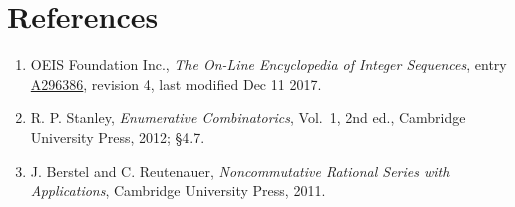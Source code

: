 \documentclass[11pt]{article}
\theoremstyle{definition}
\begin{document}
\section{References}

\begin{enumerate}

\item OEIS Foundation Inc., \emph{The On-Line Encyclopedia of Integer Sequences}, entry \href{https://oeis.org/A296386}{A296386}, revision 4, last modified Dec 11 2017.

\item R. P. Stanley, \emph{Enumerative Combinatorics}, Vol.~1, 2nd ed., Cambridge University Press, 2012; \S4.7.

\item J. Berstel and C. Reutenauer, \emph{Noncommutative Rational Series with Applications}, Cambridge University Press, 2011.

\end{enumerate}
\end{document}
